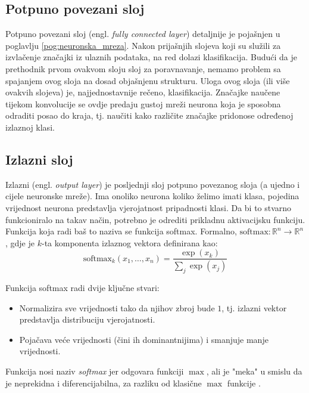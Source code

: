 \subsection{Potpuno povezani sloj}
\label{sub:dense}
Potpuno povezani sloj (engl. \textit{fully connected layer}) detaljnije je pojašnjen u poglavlju
\ref{pog:neuronska_mreza}. Nakon prijašnjih slojeva koji su služili za izvlačenje
značajki iz ulaznih podataka, na red dolazi klasifikacija. Budući da je prethodnik
prvom ovakvom sloju sloj za poravnavanje, nemamo problem sa spajanjem ovog sloja na dosad
objašnjenu strukturu. Uloga ovog sloja (ili više ovakvih slojeva) je, najjednostavnije
rečeno, klasifikacija. Značajke naučene tijekom konvolucije se ovdje predaju gustoj mreži
neurona koja je sposobna odraditi posao do kraja, tj. naučiti kako različite značajke
pridonose određenoj izlaznoj klasi.

\subsection{Izlazni sloj}
\label{sub:output}
Izlazni (engl. \textit{output layer}) je posljednji sloj potpuno povezanog sloja (a ujedno i cijele
neuronske mreže). Ima onoliko neurona koliko želimo imati klasa, pojedina vrijednost
neurona predstavlja vjerojatnost pripadnosti klasi. Da bi to stvarno funkcioniralo na takav
način, potrebno je odrediti prikladnu aktivacijsku funkciju. Funkcija koja radi baš to 
naziva se funkcija softmax. 
Formalno, \( \text{softmax} : \mathbb{R}^n \to \mathbb{R}^n \),
gdje je \( k \)-ta komponenta izlaznog vektora definirana kao:
\begin{equation}
\text{softmax}_k(x_1, \dots, x_n) = \frac{\exp(x_k)}{\sum_{j} \exp(x_j)}
\end{equation}

Funkcija softmax radi dvije ključne stvari:
\begin{itemize}
    \item Normalizira sve vrijednosti tako da njihov zbroj bude \( 1 \), tj. izlazni vektor 
        predstavlja distribuciju vjerojatnosti.
    \item Pojačava veće vrijednosti (čini ih dominantnijima) i smanjuje manje vrijednosti.
\end{itemize}

Funkcija nosi naziv \textit{softmax} jer odgovara funkciji \( \max \), ali je "meka" u smislu
da je neprekidna i diferencijabilna, za razliku od klasične \( \max \) funkcije 
\cite{snajder2023logreg}.

